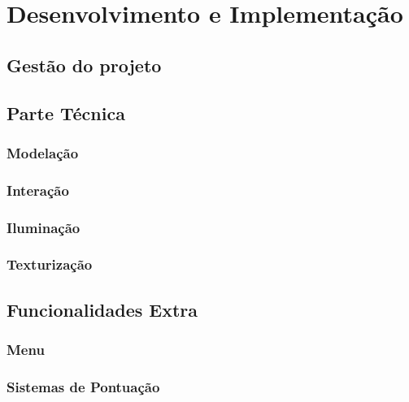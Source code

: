 \chapter{Desenvolvimento e Implementação}
\label{chap:dens-imp}

\section{Gestão do projeto}
\label{chap4:sec:gestao-proj}


\section{Parte Técnica}
\label{chap4:sec:p-tecnica}

\subsection{Modelação}

\subsection{Interação}

\subsection{Iluminação}

\subsection{Texturização}


\section{Funcionalidades Extra}
\label{chap4:sec:func-extra}

\subsection{Menu}

\subsection{Sistemas de Pontuação}
